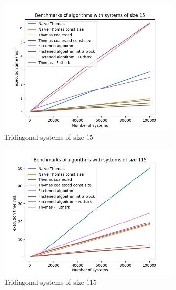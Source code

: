 \documentclass[a4paper,oneside]{memoir}
\begin{document}
\begin{figure}[H]
    \begin{subfigure}[b]{0.6\textwidth}
        \centering
        \includegraphics[width=\textwidth]{timings_15.png}
        \caption{Tridiagonal systems of size 15}
        \label{fig:bench15}
    \end{subfigure}
    \begin{subfigure}[b]{0.6\textwidth}
        \centering
    \includegraphics[width=\textwidth]{timings_115.png}
    \caption{Tridiagonal systems of size 115}
    \label{fig:bench115}
        \end{subfigure}
    \begin{subfigure}[b]{0.6\textwidth}

\end{subfigure}
\end{figure}
\end{document}
